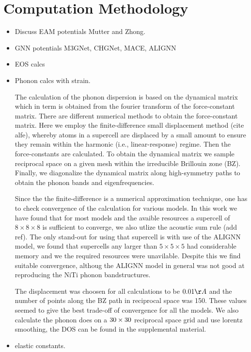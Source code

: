 \documentclass[preprint]{elsarticle}
\begin{document}
\section{Computation Methodology}
\label{sec:methods}

\begin{itemize}
\item Discuss EAM potentials Mutter and Zhong.
\item GNN potentials M3GNet, CHGNet, MACE, ALIGNN
\item EOS calcs
\item Phonon calcs with strain.
  
  The calculation of the phonon dispersion is based on the dynamical matrix which in term is obtained from the fourier transform of the force-constant matrix. There are different numerical methods to obtain the force-constant matrix. Here we employ the finite-difference small displacement method (cite alfe), whereby atoms in a supercell are displaced by a small amount to ensure they remain within the harmonic (i.e., linear-response) regime. Then the force-constants are calculated. To obtain the dynamical matrix we sample reciprocal space on a given mesh within the irreducible Brillouin zone (BZ). Finally, we diagonalize the dynamical matrix along high-symmetry paths to obtain the phonon bands and eigenfrequencies. \par

  Since the the finite-difference is a numerical approximation technique, one has to check convergence of the calculation for various models. In this work we have found that for most models and the avaible resources a supercell of $8\times8\times8$ is sufficient to converge, we also utlize the acoustic sum rule (add ref). The only stand-out for using that supercell is with use of the ALIGNN model, we found that supercells any larger than $5\times5\times5$ had considerable memory and we the required resources were unavilable. Despite this we find suitable convergence, althoug the ALIGNN model in general was not good at reproducing the NiTi phonon bandstructures. \par

  The displacement was choosen for all calculations to be $0.01\AA$ and the number of points along the BZ path in reciprocal space was 150. These values seemed to give the best trade-off of convergence for all the models. We also calculate the phonon does on a $30\times30\time30$ reciprocal space grid and use lorentz smoothing, the DOS can be found in the supplemental material.\par

  
\item elastic constants.
\end{itemize}
\end{document}
